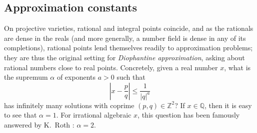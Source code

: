 \documentclass[a4paper, twoside, 11pt]{amsart}
\theoremstyle{definition}
\newcommand{\QQ}{\mathbb{Q}}
\newcommand{\ZZ}{\mathbb{Z}}
\begin{document}
\subsection{Approximation constants}
On projective varieties, rational and integral points coincide, and as the rationals are dense in the reals (and more generally, a number field is dense in any of its completions), rational points lend themselves readily to approximation problems; they are thus the original setting for \emph{Diophantine approximation}, asking about rational numbers close to real points. Concretely, given a real number $x$, what is the supremum $\alpha$ of exponents $a>0$ such that
\begin{equation*}
	\left|x-\frac{p}{q}\right| \le \frac{1}{|q|^a}
\end{equation*}
has infinitely many solutions with coprime $(p,q)\in \ZZ^2$? If $x\in \QQ$, then it is easy to see that $\alpha=1$. For irrational algebraic $x$, this question has been famously answered by K.~Roth \cite{Roth}: $\alpha =2$. 
\end{document}
